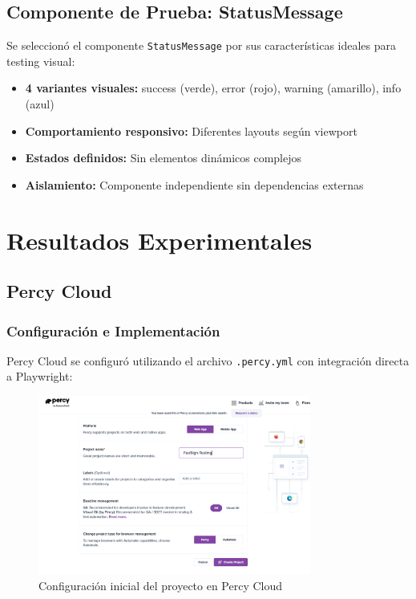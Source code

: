 \documentclass{article}
\begin{document}
\subsection{Componente de Prueba: StatusMessage}
Se seleccionó el componente \texttt{StatusMessage} por sus características ideales para testing visual:
\begin{itemize}[nosep]
\item \textbf{4 variantes visuales:} success (verde), error (rojo), warning (amarillo), info (azul)
\item \textbf{Comportamiento responsivo:} Diferentes layouts según viewport
\item \textbf{Estados definidos:} Sin elementos dinámicos complejos
\item \textbf{Aislamiento:} Componente independiente sin dependencias externas
\end{itemize}

\section{Resultados Experimentales}

\subsection{Percy Cloud}

\subsubsection{Configuración e Implementación}
Percy Cloud se configuró utilizando el archivo \texttt{.percy.yml} con integración directa a Playwright:

\begin{figure}[H]
\centering
\includegraphics[width=0.8\textwidth]{percy/createProject.png}
\caption{Configuración inicial del proyecto en Percy Cloud}
\label{fig:percy-setup}
\end{figure}
\end{document}
